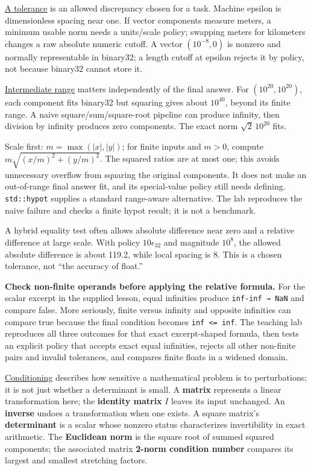 \hypertarget{01-foundations-i-ch001-representation-lessons-applied-to-numerical-apis}{}

\hyperref[appendix-0ec599f8ba27]{A tolerance} is an allowed discrepancy chosen for a task. Machine epsilon is dimensionless spacing near one. If vector components measure meters, a minimum usable norm needs a units/scale policy; swapping meters for kilometers changes a raw absolute numeric cutoff. A vector \((10^{-8},0)\) is nonzero and normally representable in binary32; a length cutoff at epsilon rejects it by policy, not because binary32 cannot store it.

\hyperref[appendix-7f1e17dcafb1]{Intermediate range} matters independently of the final answer. For \((10^{20},10^{20})\), each component fits binary32 but squaring gives about \(10^{40}\), beyond its finite range. A naive square/sum/square-root pipeline can produce infinity, then division by infinity produces zero components. The exact norm \(\sqrt2\,10^{20}\) fits.

Scale first: \(m=\max(|x|,|y|)\); for finite inputs and \(m>0\), compute \(m\sqrt{(x/m)^2+(y/m)^2}\). The squared ratios are at most one; this avoids unnecessary overflow from squaring the original components. It does not make an out-of-range final answer fit, and its special-value policy still needs defining. \texttt{std::hypot} supplies a standard range-aware alternative. The lab reproduces the naive failure and checks a finite hypot result; it is not a benchmark.

A hybrid equality test often allows absolute difference near zero and a relative difference at large scale. With policy \(10\epsilon_{32}\) and magnitude \(10^8\), the allowed absolute difference is about 119.2, while local spacing is 8. This is a chosen tolerance, not ``the accuracy of float.''

\textbf{Check non-finite operands before applying the relative formula.} For the scalar excerpt in the supplied lesson, equal infinities produce \texttt{inf-inf\ →\ NaN} and compare false. More seriously, finite versus infinity and opposite infinities can compare true because the final condition becomes \texttt{inf\ \textless{}=\ inf}. The teaching lab reproduces all three outcomes for that exact excerpt-shaped formula, then tests an explicit policy that accepts exact equal infinities, rejects all other non-finite pairs and invalid tolerances, and compares finite floats in a widened domain.

\hyperref[appendix-8f6a01f284a7]{Conditioning} describes how sensitive a mathematical problem is to perturbations; it is not just whether a determinant is small. A \textbf{matrix} represents a linear transformation here; the \textbf{identity matrix} \(I\) leaves its input unchanged. An \textbf{inverse} undoes a transformation when one exists. A square matrix's \textbf{determinant} is a scalar whose nonzero status characterizes invertibility in exact arithmetic. The \textbf{Euclidean norm} is the square root of summed squared components; the associated matrix \textbf{2-norm condition number} compares its largest and smallest stretching factors.


